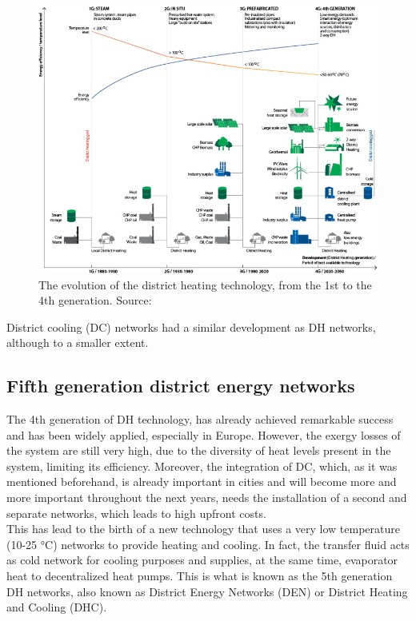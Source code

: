 \documentclass{article}
\begin{document}
\begin{figure}[h!]
\centering
\includegraphics[width=1\textwidth]{4GDH.jpg}
\caption{The evolution of the district heating technology, from the 1st to the 4th generation. Source: \cite{lund4thGenerationDistrict2014}}
\label{fig:4GDH}
\end{figure}

District cooling (DC) networks had a similar development as DH networks, although to a smaller extent. 

\subsection{Fifth generation district energy networks}
The 4th generation of DH technology, has already achieved remarkable success and has been widely applied, especially in Europe. However, the exergy losses of the system are still very high, due to the diversity of heat levels present in the system, limiting its efficiency. Moreover, the integration of DC, which, as it was mentioned beforehand, is already important in cities and will become more and more important throughout the next years, needs the installation of a second and separate networks, which leads to high upfront costs. \\
This has lead to the birth of a new technology that uses a very low temperature (10-25 \si{\celsius}) networks to provide heating and cooling. In fact, the transfer fluid acts as cold network for cooling purposes and supplies, at the same time, evaporator heat to decentralized heat pumps. This is what is known as the 5th generation DH networks, also known as District Energy Networks (DEN) or District Heating and Cooling (DHC).\\
\end{document}
